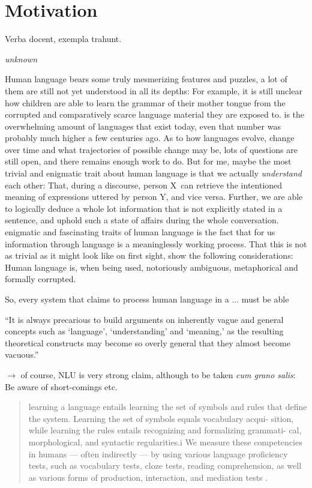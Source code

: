 \label{chap:1_intro}
\section{Motivation}

\epigraph{Verba docent, exempla trahunt.}{\textit{unknown}}

Human language bears some truly mesmerizing features and puzzles, a lot of them are still not
yet understood in all its depths: For example, it is still unclear how children are able to
learn the grammar of their mother tongue from the corrupted and comparatively scarce language
material they are exposed to. %
is the overwhelming amount of languages that exist today, even that number was probably much
higher a few centuries ago.  As to how languages evolve, change over time and what trajectories
of possible change may be, lots of questions are still open, and there remains enough work
to do.  But for me, maybe the most trivial and enigmatic trait about human language is that
we actually \emph{understand} each other: That, during a discourse, person X can retrieve
the intentioned meaning of expressions uttered by person Y, and vice versa.  Further, we are
able to logically deduce a whole lot information that is not explicitly stated in a sentence,
and uphold such a state of affairs during the whole conversation.  %
enigmatic and fascinating traits of human language is the fact that for us %
information through language is a meaninglessly working process.  That this is not as trivial
as it might look like on first sight, show the following considerations: Human language is,
when being used, notoriously ambiguous, metaphorical and formally corrupted.

So, every system that claims to process human language in a ... must be able

``It is always precarious to build arguments on inherently vague and general
concepts such as `language', `understanding' and `meaning,' as the resulting
theoretical constructs may become so overly general that they almost become
vacuous.'' \cite{sahlgren2021singleton}

{\color{red} $\rightarrow$ of course, NLU is very strong claim, although to be taken \emph{cum grano salis}:
Be aware of short-comings etc.}

\begin{quote}
  learning a language entails learning the set of symbols and rules that define the
  system. Learning the set of symbols equals vocabulary acqui- sition, while learning
  the rules entails recognizing and formalizing grammati- cal, morphological, and
  syntactic regularities.i We measure these competencies in humans — often indirectly
  — by using various language proficiency tests, such as vocabulary tests, cloze
  tests, reading comprehension, as well as various forms of production, interaction,
  and mediation tests \textelp{}. \cite{sahlgren2021singleton}
\end{quote}

